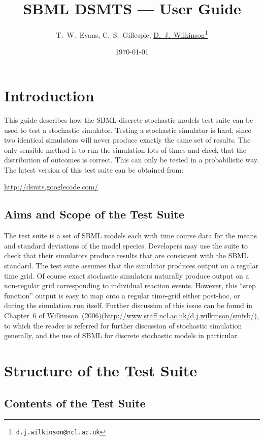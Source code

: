 \documentclass[12pt,a4paper]{article}
\title{SBML DSMTS --- User Guide}
\author{T.~W.~Evans, C.~S.~Gillespie,  \href{http://www.staff.ncl.ac.uk/d.j.wilkinson/}{D.~J.~Wilkinson}\thanks{\texttt{d.j.wilkinson@ncl.ac.uk}}}
\date{\today}
\begin{document}
\sf\maketitle

\section{Introduction} 

This guide describes how the SBML discrete stochastic models test
suite can be used to test a stochastic simulator. Testing a stochastic
simulator is hard, since two identical simulators will never produce
exactly the same set of results. The only sensible method is to run
the simulation lots of times and check that the distribution of
outcomes is correct. This can only be tested in a probabilistic way.
The latest version of this test suite can be obtained from:
\centerline{\url{http://dsmts.googlecode.com/}}

\subsection{Aims and Scope of the Test Suite}

The test suite is a set of SBML models each with time course data for
the means and standard deviations of the model species. Developers may
use the suite to check that their simulators produce results that are
consistent with the SBML standard. The test suite assumes that the
simulator produces output on a regular time grid. Of course exact
stochastic simulators naturally produce output on a non-regular grid
corresponding to individual reaction events. However, this ``step
function'' output is easy to map onto a regular time-grid either
post-hoc, or during the simulation run itself. Further discussion of
this issue can be found in Chapter~6 of
Wilkinson~(2006)(\url{http://www.staff.ncl.ac.uk/d.j.wilkinson/smfsb/}),
to which the reader is referred for further discussion of stochastic
simulation generally, and the use of SBML for discrete stochastic
models in particular.

\section{Structure of the Test Suite}

\subsection{Contents of the Test Suite}
\end{document}
